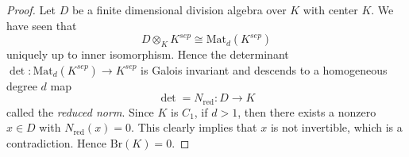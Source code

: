 \documentclass[10pt,a4paper]{amsart}
\theoremstyle{plain}
\theoremstyle{definition}
\theoremstyle{remark}
\numberwithin{equation}{subsection}
\begin{document}
\begin{proof}
Let $D$ be a finite dimensional division algebra over $K$ with center $K$. We
have seen that
$$
D \otimes_K K^{sep} \cong \text{Mat}_d(K^{sep})
$$
uniquely up to inner isomorphism. Hence the determinant $\det :
\text{Mat}_d(K^{sep}) \to K^{sep}$ is Galois invariant and descends to a
homogeneous degree $d$ map
$$
\det = N_\text{red} : D \longrightarrow K
$$
called the {\it reduced norm}. Since $K$ is $C_1$, if $d > 1$, then there
exists a nonzero $x \in D$ with $N_\text{red}(x) = 0$. This clearly implies
that $x$ is not invertible, which is a contradiction. Hence $\text{Br}(K) = 0$.
\end{proof}
\end{document}
